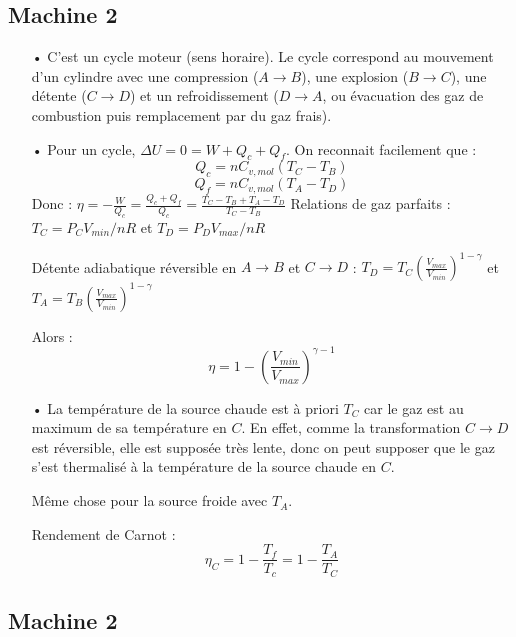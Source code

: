 \documentclass{report}
\begin{document}
\subsection*{Machine 2}
\begin{itemize}
	\item[•] 
C'est un cycle moteur (sens horaire). Le cycle correspond au mouvement d'un cylindre avec une compression ($A\longrightarrow B$), une explosion ($B\longrightarrow C$), une détente  ($C\longrightarrow D$) et un refroidissement ($D\longrightarrow A$, ou évacuation des gaz de combustion puis remplacement par du gaz frais).
	\item[•]
Pour un cycle, $\Delta U = 0 = W + Q_c + Q_f$. On reconnait facilement que :
\begin{equation}
	Q_c = nC_{v,mol}(T_C-T_B)
\end{equation}
\begin{equation}
	Q_f = nC_{v,mol}(T_A-T_D)
\end{equation}
Donc :
$\eta = -\frac{W}{Q_c}=\frac{Q_c +Q_f}{Q_c}=\frac{T_C-T_B + T_A-T_D}{T_C-T_B}$
Relations de gaz parfaits : $T_C=P_CV_{min}/nR$ et $T_D=P_DV_{max}/nR$

Détente adiabatique réversible en $A\longrightarrow B$ et $C\longrightarrow D$ : $T_D = T_C\left( \frac{V_{max}}{V_{min}}\right)^{1-\gamma}$ et $T_A = T_B\left( \frac{V_{max}}{V_{min}}\right)^{1-\gamma}$

Alors :
\begin{equation}
	\eta = 1-\left( \frac{V_{min}}{V_{max}}\right)^{\gamma -1}
\end{equation}
\item[•] La température de la source chaude est à priori $T_C$ car le gaz est au maximum de sa température en $C$. En effet, comme la transformation $C\longrightarrow D$ est réversible, elle est supposée très lente, donc on peut supposer que le gaz s'est thermalisé à la température de la source chaude en $C$. 

Même chose pour la source froide avec $T_A$. 

Rendement de Carnot :
\begin{equation}
	\eta_C = 1-\frac{T_f}{T_c} = 1-\frac{T_A}{T_C}
\end{equation}

\end{itemize}

\subsection*{Machine 2}
\end{document}
